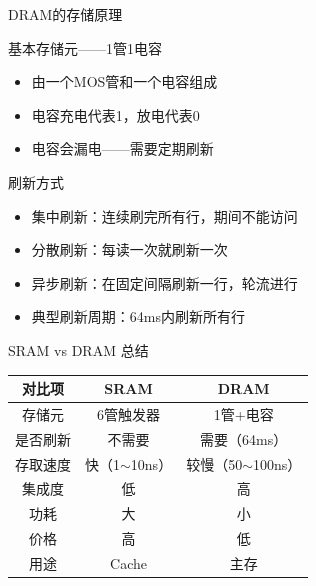 \documentclass[10pt, aspectratio=169]{beamer}
\begin{document}
\begin{frame}[t]{DRAM的存储原理}
    \begin{block}{基本存储元——1管1电容}
        \begin{itemize}
            \item 由一个MOS管和一个电容组成
            \item 电容充电代表1，放电代表0
            \item 电容会漏电——需要定期刷新
        \end{itemize}
    \end{block}
    \vspace{0.3em}
    \begin{block}{刷新方式}
        \begin{itemize}
            \item 集中刷新：连续刷完所有行，期间不能访问
            \item 分散刷新：每读一次就刷新一次
            \item 异步刷新：在固定间隔刷新一行，轮流进行
        \end{itemize}
    \end{block}
    \vspace{0.3em}
    \begin{itemize}
        \item 典型刷新周期：64ms内刷新所有行
    \end{itemize}
\end{frame}

\begin{frame}{SRAM vs DRAM 总结}
    \begin{center}
        \begin{tabular}{|c|c|c|}
            \hline
            \textbf{对比项} & \textbf{SRAM} & \textbf{DRAM} \\
            \hline
            存储元 & 6管触发器 & 1管+电容 \\
            \hline
            是否刷新 & 不需要 & 需要（64ms） \\
            \hline
            存取速度 & 快（1$\sim$10ns） & 较慢（50$\sim$100ns） \\
            \hline
            集成度 & 低 & 高 \\
            \hline
            功耗 & 大 & 小 \\
            \hline
            价格 & 高 & 低 \\
            \hline
            用途 & Cache & 主存 \\
            \hline
        \end{tabular}
    \end{center}
\end{frame}
\end{document}
